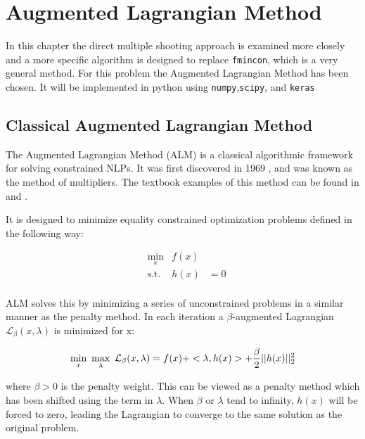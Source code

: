 \chapter{Augmented Lagrangian Method}
\label{cha:2}
In this chapter the direct multiple shooting approach is examined more closely and a more specific algorithm is designed to replace \texttt{fmincon}, which is a very general method. For this problem the Augmented Lagrangian Method has been chosen. It will be implemented in python using \texttt{numpy},\texttt{scipy}, and \texttt{keras}

\section{Classical Augmented Lagrangian Method}
The Augmented Lagrangian Method (ALM) is a classical algorithmic framework for solving constrained NLPs. It was first discovered in 1969 \cite{Hestenes1969},\cite{Powell1969} and was known as the method of multipliers. The textbook examples of this method can be found in \cite{Birgin2009} and \cite{bertsekas2014constrained}.

It is designed to minimize equality constrained optimization problems defined in the following way:

\begin{equation}
	\begin{aligned}
	& \underset{x}{\text{min}} & f(x) & \\
	& \text{s.t.} & h(x) &= 0 \\
	\end{aligned}
\end{equation}

ALM solves this by minimizing a series of unconstrained problems in a similar manner as the penalty method. In each iteration a $\beta$-augmented Lagrangian $\mathcal{L}_\beta(x,\lambda)$ is minimized for x:

\begin{equation}
	\underset{x}{\text{min}} \hspace{.5em} \underset{\lambda}{\text{max}} \hspace{.5em}  \mathcal{L}_\beta(x,\lambda) = f(x) + <\lambda,h(x)> + \frac{\beta}{2} || h(x) ||^2_2
\end{equation}

where $\beta>0$ is the penalty weight. This can be viewed as a penalty method which has been shifted using the term in $\lambda$\cite{Birgin2009}. When $\beta$ or $\lambda$ tend to infinity, $h(x)$ will be forced to zero, leading the Lagrangian to converge to the same solution as the original problem.

